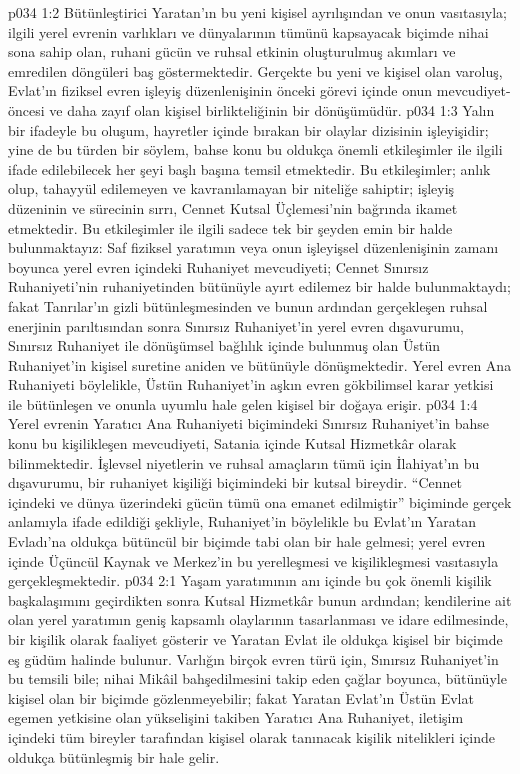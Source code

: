 \vs p034 1:2 Bütünleştirici Yaratan’ın bu yeni kişisel ayrılışından ve onun vasıtasıyla; ilgili yerel evrenin varlıkları ve dünyalarının tümünü kapsayacak biçimde nihai sona sahip olan, ruhani gücün ve ruhsal etkinin oluşturulmuş akımları ve emredilen döngüleri baş göstermektedir. Gerçekte bu yeni ve kişisel olan varoluş, Evlat’ın fiziksel evren işleyiş düzenlenişinin önceki görevi içinde onun mevcudiyet\hyp{}öncesi ve daha zayıf olan kişisel birlikteliğinin bir dönüşümüdür.
\vs p034 1:3 Yalın bir ifadeyle bu oluşum, hayretler içinde bırakan bir olaylar dizisinin işleyişidir; yine de bu türden bir söylem, bahse konu bu oldukça önemli etkileşimler ile ilgili ifade edilebilecek her şeyi başlı başına temsil etmektedir. Bu etkileşimler; anlık olup, tahayyül edilemeyen ve kavranılamayan bir niteliğe sahiptir; işleyiş düzeninin ve sürecinin sırrı, Cennet Kutsal Üçlemesi’nin bağrında ikamet etmektedir. Bu etkileşimler ile ilgili sadece tek bir şeyden emin bir halde bulunmaktayız: Saf fiziksel yaratımın veya onun işleyişsel düzenlenişinin zamanı boyunca yerel evren içindeki Ruhaniyet mevcudiyeti; Cennet Sınırsız Ruhaniyeti’nin ruhaniyetinden bütünüyle ayırt edilemez bir halde bulunmaktaydı; fakat Tanrılar’ın gizli bütünleşmesinden ve bunun ardından gerçekleşen ruhsal enerjinin parıltısından sonra Sınırsız Ruhaniyet’in yerel evren dışavurumu, Sınırsız Ruhaniyet ile dönüşümsel bağlılık içinde bulunmuş olan Üstün Ruhaniyet’in kişisel suretine aniden ve bütünüyle dönüşmektedir. Yerel evren Ana Ruhaniyeti böylelikle, Üstün Ruhaniyet’in aşkın evren gökbilimsel karar yetkisi ile bütünleşen ve onunla uyumlu hale gelen kişisel bir doğaya erişir.
\vs p034 1:4 Yerel evrenin Yaratıcı Ana Ruhaniyeti biçimindeki Sınırsız Ruhaniyet’in bahse konu bu kişilikleşen mevcudiyeti, Satania içinde Kutsal Hizmetkâr olarak bilinmektedir. İşlevsel niyetlerin ve ruhsal amaçların tümü için İlahiyat’ın bu dışavurumu, bir ruhaniyet kişiliği biçimindeki bir kutsal bireydir. “Cennet içindeki ve dünya üzerindeki gücün tümü ona emanet edilmiştir” biçiminde gerçek anlamıyla ifade edildiği şekliyle, Ruhaniyet’in böylelikle bu Evlat’ın Yaratan Evladı’na oldukça bütüncül bir biçimde tabi olan bir hale gelmesi; yerel evren içinde Üçüncül Kaynak ve Merkez’in bu yerelleşmesi ve kişilikleşmesi vasıtasıyla gerçekleşmektedir.
\vs p034 2:1 Yaşam yaratımının anı içinde bu çok önemli kişilik başkalaşımını geçirdikten sonra Kutsal Hizmetkâr bunun ardından; kendilerine ait olan yerel yaratımın geniş kapsamlı olaylarının tasarlanması ve idare edilmesinde, bir kişilik olarak faaliyet gösterir ve Yaratan Evlat ile oldukça kişisel bir biçimde eş güdüm halinde bulunur. Varlığın birçok evren türü için, Sınırsız Ruhaniyet’in bu temsili bile; nihai Mikâil bahşedilmesini takip eden çağlar boyunca, bütünüyle kişisel olan bir biçimde gözlenmeyebilir; fakat Yaratan Evlat’ın Üstün Evlat egemen yetkisine olan yükselişini takiben Yaratıcı Ana Ruhaniyet, iletişim içindeki tüm bireyler tarafından kişisel olarak tanınacak kişilik nitelikleri içinde oldukça bütünleşmiş bir hale gelir.
